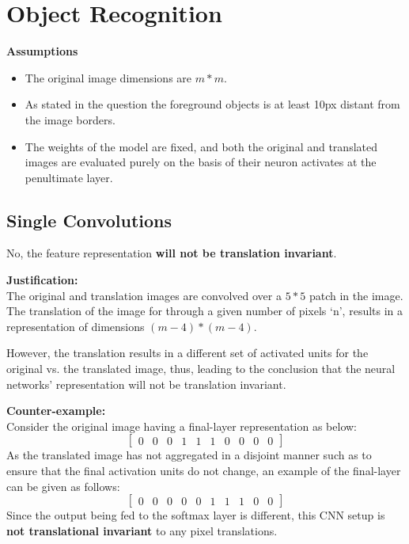 \documentclass[parskip=half]{scrartcl}
\begin{document}



\section{Object Recognition} %
\label{sec:object_recognition}

    \textbf{Assumptions}
    \begin{itemize}
        \item 
        The original image dimensions are $m*m$.
        \item 
        As stated in the question the foreground objects is at least 10px distant from the image borders.
        \item 
        The weights of the model are fixed, and both the original and translated images are evaluated purely on the basis of their neuron activates at the penultimate layer.
    \end{itemize}

    \subsection{Single Convolutions} %
    \label{sub:single_convolutions}

        No, the feature representation \textbf{will not be translation invariant}.

        \textbf{Justification:}\\
        The original and translation images are convolved over a $5*5$ patch in the image.
        The translation of the image for through a given number of pixels `n', results in a representation of dimensions $(m-4)*(m-4)$.

        However, the translation results in a different set of activated units for the original vs. the translated image, thus, leading to the conclusion that the neural networks' representation will not be translation invariant.

        \textbf{Counter-example:}\\
        Consider the original image having a final-layer representation as below:
        \begin{equation*}
            \begin{bmatrix}
                0 & 0 & 0 & 1 & 1 & 1 & 0 & 0 & 0 & 0
            \end{bmatrix}
        \end{equation*}
        As the translated image has not aggregated in a disjoint manner such as to ensure that the final activation units do not change, an example of the final-layer can be given as follows:
        \begin{equation*}
            \begin{bmatrix}
                0 & 0 & 0 & 0 & 0 & 1 & 1 & 1 & 0 & 0
            \end{bmatrix}
        \end{equation*}
        Since the output being fed to the softmax layer is different, this CNN setup is \textbf{not translational invariant} to any pixel translations.
\end{document}
